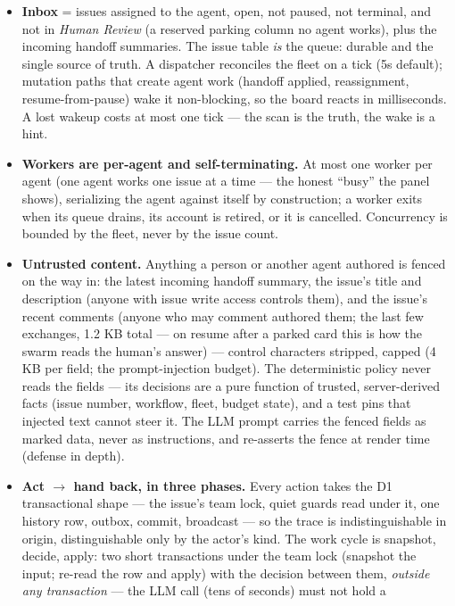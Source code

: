 \documentclass[11pt,a4paper]{report}
\begin{document}
\begin{itemize}
\item \textbf{Inbox} = issues assigned to the agent, open, not paused,
  not terminal, and not in \emph{Human Review} (a reserved parking
  column no agent works), plus the incoming handoff summaries. The issue table
  \emph{is} the queue: durable and the single source of truth. A
  dispatcher reconciles the fleet on a tick (5s default);
  mutation paths that create agent work (handoff applied, reassignment,
  resume-from-pause) wake it non-blocking, so the board reacts in
  milliseconds. A lost wakeup costs at most one tick --- the scan is
  the truth, the wake is a hint.
\item \textbf{Workers are per-agent and self-terminating.} At most one
  worker per agent (one agent works one issue at a time --- the honest
  ``busy'' the panel shows), serializing the agent against itself by
  construction; a worker exits when its queue drains, its account is
  retired, or it is cancelled. Concurrency is bounded by the fleet, never
  by the issue count.
\item \textbf{Untrusted content.} Anything a person or another agent
  authored is fenced on the way in: the latest incoming handoff summary,
  the issue's title and description (anyone with issue write access
  controls them), and the issue's recent comments (anyone who may
  comment authored them; the last few exchanges, 1.2 KB total --- on
  resume after a parked card this is how the swarm reads the human's
  answer) --- control characters stripped, capped (4 KB per field; the
  prompt-injection budget). The deterministic policy never
  reads the fields --- its decisions are a pure function of trusted,
  server-derived facts (issue number, workflow, fleet, budget state), and
  a test pins that injected text cannot steer it. The LLM prompt carries
  the fenced fields as marked data, never as instructions, and
  re-asserts the fence at render time (defense in depth).
\item \textbf{Act $\to$ hand back, in three phases.} Every action takes
  the D1 transactional shape --- the issue's team lock, quiet guards
  read under it, one history row, outbox, commit, broadcast --- so the
  trace is indistinguishable in origin, distinguishable only by the
  actor's kind. The work cycle is snapshot, decide, apply: two short
  transactions under the team lock (snapshot the input; re-read the row
  and apply) with the decision between them, \emph{outside any
  transaction} --- the LLM call (tens of seconds) must not hold a

\end{itemize}
\end{document}
